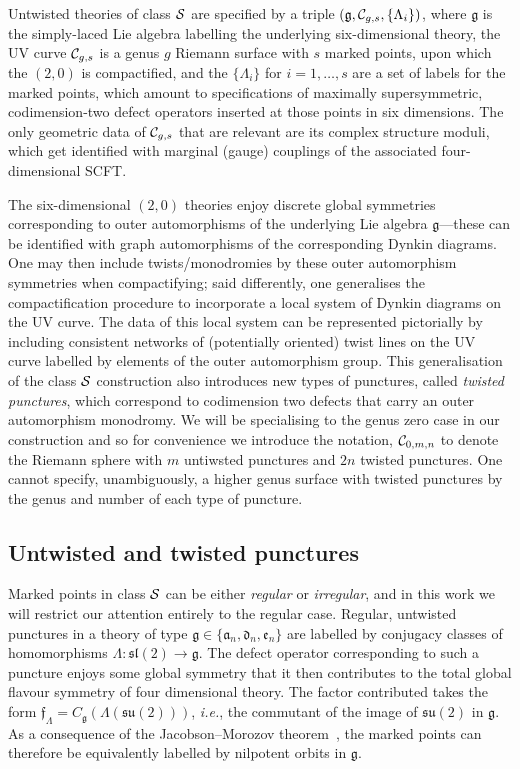 \documentclass[a4paper]{article}
\def\CC{{\cal C}}
\def\SS{{\cal S}}
\def\slf{\mathfrak{sl}}
\def\suf{\mathfrak{su}}
\def\af{\mathfrak{a}}
\def\df{\mathfrak{d}}
\def\ef{\mathfrak{e}}
\def\gf{\mathfrak{g}}
\def \ff{\mathfrak{f}}
\def \ie{{\it i.e.}}
\begin{document}
Untwisted theories of class $\SS$ are specified by a triple $(\gf,\CC_{g,s},\{\Lambda_i\})$, where $\gf$ is the simply-laced Lie algebra labelling the underlying six-dimensional theory, the UV curve $\CC_{g,s}$ is a genus $g$ Riemann surface with $s$ marked points, upon which the $(2,0)$ is compactified, and the $\{\Lambda_i\}$ for $i=1,\ldots,s$ are a set of labels for the marked points, which amount to specifications of maximally supersymmetric, codimension-two defect operators inserted at those points in six dimensions. The only geometric data of $\CC_{g,s}$ that are relevant are its complex structure moduli, which get identified with marginal (gauge) couplings of the associated four-dimensional SCFT.

The six-dimensional $(2,0)$ theories enjoy discrete global symmetries corresponding to outer automorphisms of the underlying Lie algebra $\gf$---these can be identified with graph automorphisms of the corresponding Dynkin diagrams. One may then include twists/monodromies by these outer automorphism symmetries when compactifying; said differently, one generalises the compactification procedure to incorporate a local system of Dynkin diagrams on the UV curve. The data of this local system can be represented pictorially by including consistent networks of (potentially oriented) twist lines on the UV curve labelled by elements of the outer automorphism group. This generalisation of the class $\SS$ construction also introduces new types of punctures, called \emph{twisted punctures}, which correspond to codimension two defects that carry an outer automorphism monodromy. We will be specialising to the genus zero case in our construction and so for convenience we introduce the notation, $\CC_{0,m,n}$ to denote the Riemann sphere with $m$ untiwsted punctures and $2n$ twisted punctures. One cannot specify, unambiguously, a higher genus surface with twisted punctures by the genus and number of each type of puncture.

\subsection{\label{ssec:twisted_background/punctures}Untwisted and twisted punctures}

Marked points in class $\SS$ can be either \emph{regular} or \emph{irregular}, and in this work we will restrict our attention entirely to the regular case. Regular, untwisted punctures in a theory of type $\gf\in\{\af_n,\df_n,\ef_n\}$ are labelled by conjugacy classes of homomorphisms $\Lambda:\slf(2)\rightarrow \gf$. The defect operator corresponding to such a puncture enjoys some global symmetry that it then contributes to the total global flavour symmetry of four dimensional theory. The factor contributed takes the form $\ff_\Lambda=C_{\gf}\left(\Lambda(\suf(2))\right)$, \ie, the commutant of the image of $\suf (2)$ in $\gf$. As a consequence of the Jacobson--Morozov theorem~\cite{Collingwood:1993}, the marked points can therefore be equivalently labelled by nilpotent orbits in $\gf$.
\end{document}
